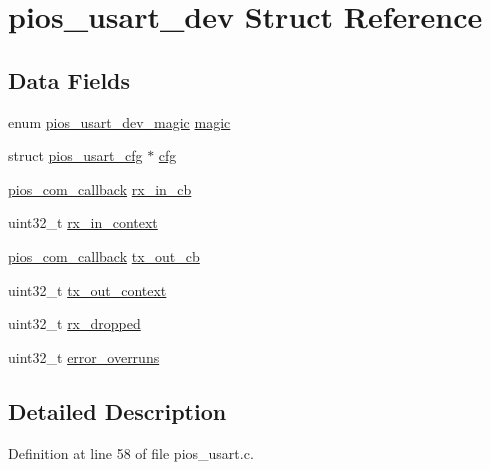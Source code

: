 \hypertarget{structpios__usart__dev}{\section{pios\-\_\-usart\-\_\-dev \-Struct \-Reference}
\label{structpios__usart__dev}
}
\subsection*{\-Data \-Fields}
\begin{DoxyCompactItemize}
\item 
enum \hyperlink{group___p_i_o_s___u_s_a_r_t_gabc5ff4f4da76683608f4140d4e343a32}{pios\-\_\-usart\-\_\-dev\-\_\-magic} \hyperlink{structpios__usart__dev_a687addd5d60a08b8e9f1387f3c82e8a8}{magic}
\item 
struct \hyperlink{structpios__usart__cfg}{pios\-\_\-usart\-\_\-cfg} $\ast$ \hyperlink{structpios__usart__dev_a33767fade40ae8e9eca5f70ee46ab5e0}{cfg}
\item 
\hyperlink{group___p_i_o_s___c_o_m_ga23f1888821f1f74a50c02adc459df597}{pios\-\_\-com\-\_\-callback} \hyperlink{structpios__usart__dev_a604c1d7dbae9c36025b38ac556734cad}{rx\-\_\-in\-\_\-cb}
\item 
uint32\-\_\-t \hyperlink{structpios__usart__dev_ab2a4099b0c4ff51081a4aaf5997979e5}{rx\-\_\-in\-\_\-context}
\item 
\hyperlink{group___p_i_o_s___c_o_m_ga23f1888821f1f74a50c02adc459df597}{pios\-\_\-com\-\_\-callback} \hyperlink{structpios__usart__dev_a492ccd307ef7d05febd54d4747028125}{tx\-\_\-out\-\_\-cb}
\item 
uint32\-\_\-t \hyperlink{structpios__usart__dev_af77f59770d9584ab03c1393ee5e937fa}{tx\-\_\-out\-\_\-context}
\item 
uint32\-\_\-t \hyperlink{structpios__usart__dev_afe1832deba4f05c2cb5c33a0f397caa5}{rx\-\_\-dropped}
\item 
uint32\-\_\-t \hyperlink{structpios__usart__dev_a39136a16dedc7d092749a2c36ef899c5}{error\-\_\-overruns}
\end{DoxyCompactItemize}


\subsection{\-Detailed \-Description}


\-Definition at line 58 of file pios\-\_\-usart.\-c.



